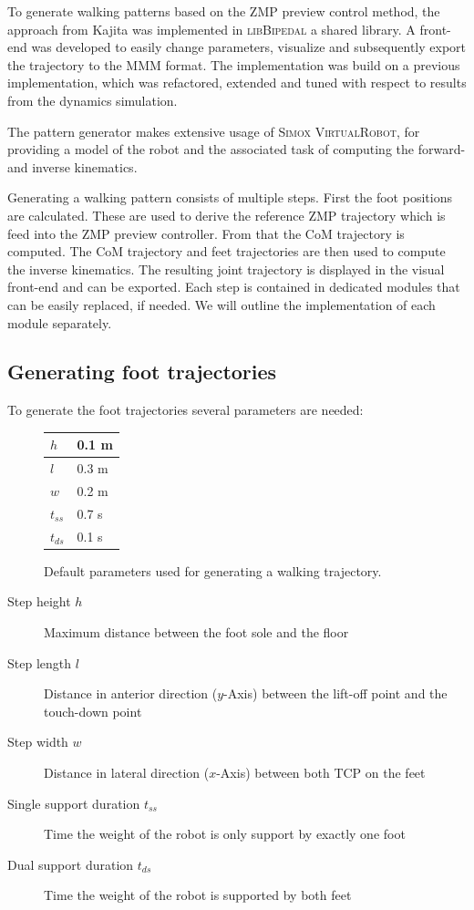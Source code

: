 \documentclass[english,ngerman]{KITreprt}
\newcommand{\name}[1]{\textsc{#1}}
\begin{document}
To generate walking patterns based on the ZMP preview control method,
the approach from Kajita was implemented in \name{libBipedal} a shared
library. A front-end was developed to easily change parameters,
visualize and subsequently export the trajectory to the \name{MMM}
format. The implementation was build on a previous implementation, which
was refactored, extended and tuned with respect to results from the
dynamics simulation.

The pattern generator makes extensive usage of
\name{Simox VirtualRobot}, for providing a model of the robot and the
associated task of computing the forward- and inverse kinematics.

Generating a walking pattern consists of multiple steps. First the foot
positions are calculated. These are used to derive the reference ZMP
trajectory which is feed into the ZMP preview controller. From that the
CoM trajectory is computed. The CoM trajectory and feet trajectories are
then used to compute the inverse kinematics. The resulting joint
trajectory is displayed in the visual front-end and can be exported.
Each step is contained in dedicated modules that can be easily replaced,
if needed. We will outline the implementation of each module separately.

\subsection{Generating foot
trajectories}\label{generating-foot-trajectories}

To generate the foot trajectories several parameters are needed:

\begin{figure}[b]
\begin{center}
  \begin{tabular}{| l | l |}
    \hline
    $h$ & 0.1 m \\ \hline
    $l$ & 0.3 m \\ \hline
    $w$ & 0.2 m \\ \hline
    $t_{ss}$ & 0.7 s\\ \hline
    $t_{ds}$ & 0.1 s\\ \hline
  \end{tabular}
\caption{Default parameters used for generating a walking trajectory.}
\label{table:pattern-parameters}
\end{center}
\end{figure}

\begin{description}
\item[Step height $h$]
Maximum distance between the foot sole and the floor
\item[Step length $l$]
Distance in anterior direction ($y$-Axis) between the lift-off point and
the touch-down point
\item[Step width $w$]
Distance in lateral direction ($x$-Axis) between both TCP on the feet
\item[Single support duration $t_{ss}$]
Time the weight of the robot is only support by exactly one foot
\item[Dual support duration $t_{ds}$]
Time the weight of the robot is supported by both feet
\end{description}
\end{document}
